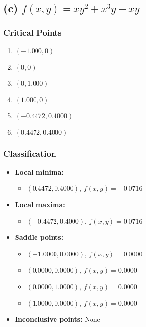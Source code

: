 \documentclass[12pt]{article}
\begin{document}
\hrulefill
\newpage

\subsection*{(c) \( f(x, y) = xy^2 + x^3y - xy \)}

\subsubsection*{Critical Points}
\begin{enumerate}
    \item \((-1.000, 0)\)
    \item \((0, 0)\)
    \item \((0, 1.000)\)
    \item \((1.000, 0)\)
    \item \((-0.4472, 0.4000)\)
    \item \((0.4472, 0.4000)\)
\end{enumerate}

\subsubsection*{Classification}
\begin{itemize}
    \item \textbf{Local minima:}
    \begin{itemize}
        \item \((0.4472, 0.4000)\), \( f(x,y) = -0.0716 \)
    \end{itemize}
    \item \textbf{Local maxima:}
    \begin{itemize}
        \item \((-0.4472, 0.4000)\), \( f(x,y) = 0.0716 \)
    \end{itemize}
    \item \textbf{Saddle points:}
    \begin{itemize}
        \item \((-1.0000, 0.0000)\), \( f(x,y) = 0.0000 \)
        \item \((0.0000, 0.0000)\), \( f(x,y) = 0.0000 \)
        \item \((0.0000, 1.0000)\), \( f(x,y) = 0.0000 \)
        \item \((1.0000, 0.0000)\), \( f(x,y) = 0.0000 \)
    \end{itemize}
    \item \textbf{Inconclusive points:} None
\end{itemize}
\end{document}
